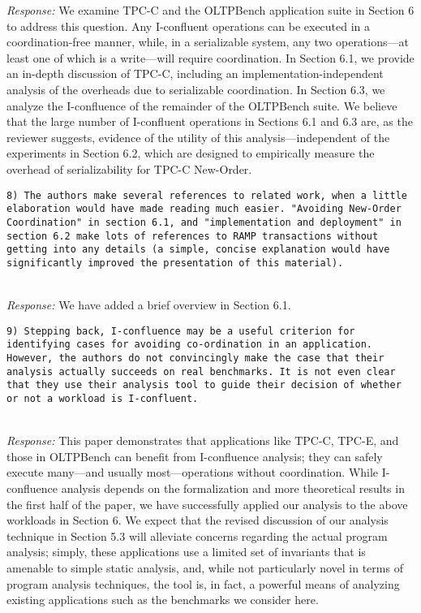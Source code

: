 \documentclass[10pt]{article}
\newcommand{\reviewer}[1] {\noindent\colorbox{reviewercolor}{\parbox{\textwidth}{\noindent\texttt{#1}}}\\}
\newcommand{\response}[1] {\noindent\textit{Response: } #1\\}
\begin{document}
\response{We examine TPC-C and the OLTPBench application suite in
  Section 6 to address this question. Any I-confluent operations can
  be executed in a coordination-free manner, while, in a serializable
  system, any two operations---at least one of which is a write---will
  require coordination. In Section 6.1, we provide an in-depth
  discussion of TPC-C, including an implementation-independent
  analysis of the overheads due to serializable coordination. In
  Section 6.3, we analyze the I-confluence of the remainder of the
  OLTPBench suite. We believe that the large number of I-confluent
  operations in Sections 6.1 and 6.3 are, as the reviewer suggests,
  evidence of the utility of this analysis---independent of the
  experiments in Section 6.2, which are designed to empirically
  measure the overhead of serializability for TPC-C New-Order.}

\reviewer{8) The authors make several references to related work, when a little elaboration would have made reading much easier. "Avoiding New-Order Coordination" in section 6.1, and "implementation and deployment" in section 6.2 make lots of references to RAMP transactions without getting into any details (a simple, concise explanation would have significantly improved the presentation of this material). }

\response{We have added a brief overview in Section 6.1.}

\reviewer{9) Stepping back, I-confluence may be a useful criterion for
  identifying cases for avoiding co-ordination in an
  application. However, the authors do not convincingly make the case
  that their analysis actually succeeds on real benchmarks. It is not
  even clear that they use their analysis tool to guide their decision
  of whether or not a workload is I-confluent.}

\response{This paper demonstrates that applications like TPC-C, TPC-E,
  and those in OLTPBench can benefit from I-confluence analysis; they
  can safely execute many---and usually most---operations without
  coordination. While I-confluence analysis depends on the
  formalization and more theoretical results in the first half of the
  paper, we have successfully applied our analysis to the above
  workloads in Section 6. We expect that the revised discussion of our
  analysis technique in Section 5.3 will alleviate concerns regarding
  the actual program analysis; simply, these applications use a
  limited set of invariants that is amenable to simple static
  analysis, and, while not particularly novel in terms of program
  analysis techniques, the tool is, in fact, a powerful means of
  analyzing existing applications such as the benchmarks we consider
  here.} %
\end{document}
